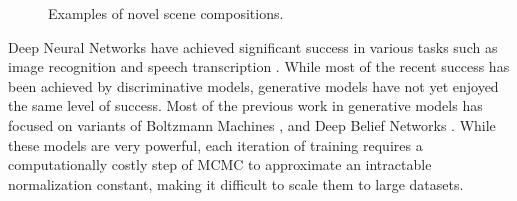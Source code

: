 \documentclass{article} %
\begin{document}
\begin{figure}[!t]
\captionsetup[subfigure]{labelformat=empty}
\vspace{-0.3cm}
\begin{center}
\quad
%
\quad
%
\quad
%
\quad
%
\end{center}
\caption{Examples of novel scene compositions.}
\label{fig:genimages4}
\vspace{-0.3cm}
\end{figure}

Deep Neural Networks have achieved significant success in various tasks such as image recognition \citep{krizhevsky_imagenet} and speech transcription \citep{graves_speech}. 
While most of the recent success has been achieved by discriminative models, generative models have not yet enjoyed the same level of success. Most of the previous work in generative models has focused on variants of Boltzmann Machines \citep{smolensky_rbm}, \citep{russ_dbm} and Deep Belief Networks \citep{hinton_dbn}. While these models are very powerful, each iteration of training requires a computationally costly step of MCMC to approximate an intractable normalization constant, making it difficult to scale them to large datasets.
\end{document}
